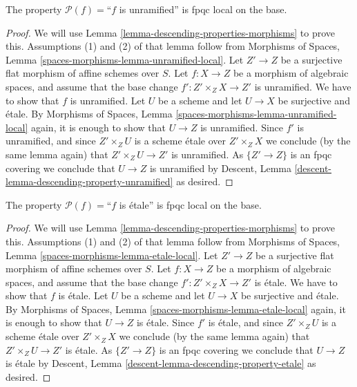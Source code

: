 \begin{lemma}
\label{lemma-descending-property-unramified}
The property $\mathcal{P}(f) =$``$f$ is unramified''
is fpqc local on the base.
\end{lemma}

\begin{proof}
We will use
Lemma \ref{lemma-descending-properties-morphisms}
to prove this. Assumptions (1) and (2) of that lemma follow from
Morphisms of Spaces,
Lemma \ref{spaces-morphisms-lemma-unramified-local}.
Let $Z' \to Z$ be a surjective flat morphism of affine schemes over $S$.
Let $f : X \to Z$ be a morphism of algebraic spaces, and assume
that the base change $f' : Z' \times_Z X \to Z'$ is unramified.
We have to show that $f$ is unramified. Let $U$ be a scheme
and let $U \to X$ be surjective and \'etale. By
Morphisms of Spaces,
Lemma \ref{spaces-morphisms-lemma-unramified-local}
again, it is enough to show that $U \to Z$ is unramified.
Since $f'$ is unramified, and since $Z' \times_Z U$ is a
scheme \'etale over $Z' \times_Z X$ we conclude (by the same lemma again) that
$Z' \times_Z U \to Z'$ is unramified.
As $\{Z' \to Z\}$ is an fpqc covering we conclude that
$U \to Z$ is unramified by
Descent, Lemma \ref{descent-lemma-descending-property-unramified}
as desired.
\end{proof}

\begin{lemma}
\label{lemma-descending-property-etale}
The property $\mathcal{P}(f) =$``$f$ is \'etale''
is fpqc local on the base.
\end{lemma}

\begin{proof}
We will use
Lemma \ref{lemma-descending-properties-morphisms}
to prove this. Assumptions (1) and (2) of that lemma follow from
Morphisms of Spaces,
Lemma \ref{spaces-morphisms-lemma-etale-local}.
Let $Z' \to Z$ be a surjective flat morphism of affine schemes over $S$.
Let $f : X \to Z$ be a morphism of algebraic spaces, and assume
that the base change $f' : Z' \times_Z X \to Z'$ is \'etale.
We have to show that $f$ is \'etale. Let $U$ be a scheme
and let $U \to X$ be surjective and \'etale. By
Morphisms of Spaces,
Lemma \ref{spaces-morphisms-lemma-etale-local}
again, it is enough to show that $U \to Z$ is \'etale.
Since $f'$ is \'etale, and since $Z' \times_Z U$ is a
scheme \'etale over $Z' \times_Z X$ we conclude (by the same lemma again) that
$Z' \times_Z U \to Z'$ is \'etale.
As $\{Z' \to Z\}$ is an fpqc covering we conclude that
$U \to Z$ is \'etale by
Descent, Lemma \ref{descent-lemma-descending-property-etale}
as desired.
\end{proof}

